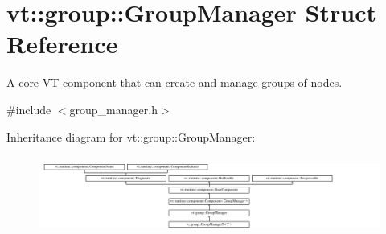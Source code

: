 \hypertarget{structvt_1_1group_1_1_group_manager}{}\section{vt\+:\+:group\+:\+:Group\+Manager Struct Reference}
\label{structvt_1_1group_1_1_group_manager}


A core VT component that can create and manage groups of nodes.  




{\ttfamily \#include $<$group\+\_\+manager.\+h$>$}

Inheritance diagram for vt\+:\+:group\+:\+:Group\+Manager\+:\begin{figure}[H]
\begin{center}
\leavevmode
\includegraphics[height=2.600619cm]{structvt_1_1group_1_1_group_manager}
\end{center}
\end{figure}
